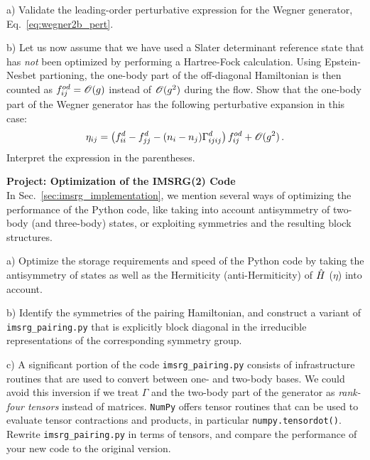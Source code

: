 {\begin{prob}\label{problem:wegner_pert}
  \item[a)]
    Validate the leading-order perturbative expression for the Wegner generator, Eq.~\eqref{eq:wegner2b_pert}.
  \item[b)]
    Let us now assume that we have used a Slater determinant reference state that 
    has \emph{not} been optimized by performing a Hartree-Fock calculation. Using
    Epstein-Nesbet partioning, the one-body part of the off-diagonal Hamiltonian
    is then counted as $f^{od}_{ij}=\mathcal{O}(g)$ instead of $\mathcal{O}(g^2)$ during the flow.
    Show that the one-body part of the Wegner generator has the following perturbative
    expansion in this case: 
    \begin{equation}\label{eq:wegner1b_pert}
      \eta_{ij} = \left(f^d_{ii} - f^d_{jj} - (n_i-n_j)\Gamma^d_{ijij}\right)f^{od}_{ij} + \OC(g^2)\,.
    \end{equation}
    Interpret the expression in the parentheses.
\end{prob}

\begin{prob}\textbf{Project: Optimization of the IMSRG(2) Code} \\
  In Sec.~\ref{sec:imsrg_implementation}, we mention several ways of optimizing 
  the performance of the Python code, like taking into account antisymmetry of
  two-body (and three-body) states, or exploiting symmetries and the resulting
  block structures.

  \item[a)] Optimize the storage requirements and speed of the Python code by taking 
  the antisymmetry of states as well as the Hermiticity (anti-Hermiticity) of $\hat{H}$ ($\eta$) 
  into account.

  \item[b)] Identify the symmetries of the pairing Hamiltonian, and construct a
  variant of \texttt{imsrg\_pairing.py} that is explicitly block diagonal in
  the irreducible representations of the corresponding symmetry group.

  \item[c)] A significant portion of the code \texttt{imsrg\_pairing.py} consists of
  infrastructure routines that are used to convert between one- and two-body bases.
  We could avoid this inversion if we treat $\Gamma$ and the two-body part of the 
  generator as \emph{rank-four tensors} instead of matrices. \texttt{NumPy}
  offers tensor routines that can be used to evaluate tensor contractions and
  products, in particular \texttt{numpy.tensordot()}. Rewrite \texttt{imsrg\_pairing.py}
  in terms of tensors, and compare the performance of your new code to the
  original version.
\end{prob}

}
